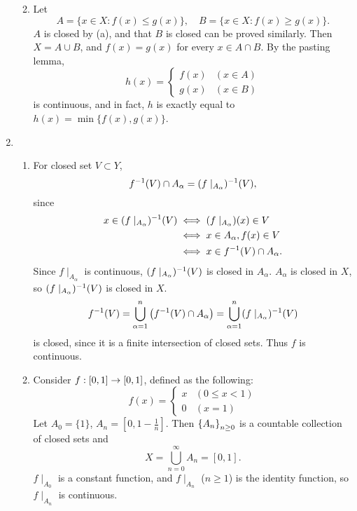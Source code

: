 \documentclass[12pt]{report}
\newcommand{\prob}[1]{\item[\large\textbf{\sffamily #1.}]}
\newcommand{\subprob}[1]{\item[\textbf{\sffamily (#1)}]}
\begin{document}
\begin{enumerate}
\begin{enumerate}
        \subprob{b} Let
        \[
            A = \{x \in X : f(x) \leq g(x)\}, \quad B = \{x \in X : f(x) \geq g(x)\}.
        \]
        \(A\) is closed by {\sf (a)}, and that \(B\) is closed can be proved similarly. Then \(X = A \cup B\), and \(f(x) = g(x)\) for every \(x \in A \cap B\). By the pasting lemma,
        \[
            h(x) = \begin{cases}
                f(x) & (x\in A) \\ g(x) & (x \in B)
            \end{cases}
        \]
        is continuous, and in fact, \(h\) is exactly equal to \(h(x) = \min\{f(x), g(x)\}\).
    \end{enumerate}

    \prob{8}
    \begin{enumerate}
        \subprob{a} For closed set \(V \subset Y\),
        \[
            f^{-1}(V) \cap A_\alpha = (f \mid_{A_\alpha})^{-1}(V),
        \]
        since
        \[
            \begin{aligned}
                x \in (f \mid_{A_\alpha})^{-1}(V) & \iff (f \mid_{A_\alpha})(x) \in V  \\
                                                 & \iff x \in A_\alpha, f(x) \in V    \\
                                                 & \iff x \in f^{-1}(V) \cap A_\alpha.
            \end{aligned}
        \]
        Since \(f \mid_{A_\alpha}\) is continuous, \((f \mid_{A_\alpha})^{-1}(V)\) is closed in \(A_\alpha\). \(A_\alpha\) is closed in \(X\), so \((f \mid_{A_\alpha})^{-1}(V)\) is closed in \(X\).
        \[
            f^{-1}(V) = \bigcup_{\alpha = 1}^n \left( f^{-1}(V) \cap A_\alpha \right) = \bigcup_{\alpha = 1}^n (f \mid_{A_\alpha})^{-1}(V)
        \]
        is closed, since it is a finite intersection of closed sets. Thus \(f\) is continuous.

        \subprob{b} Consider \(f: [0, 1] \rightarrow [0, 1]\), defined as the following:
        \[
            f(x) = \begin{cases}
                x & (0 \leq x < 1) \\ 0 & (x = 1)
            \end{cases}
        \]
        Let \(A_0 = \{1\}\), \(A_n = \left[0, 1 - \frac{1}{n}\right]\). Then \(\left\{ A_n \right\}_{n\geq 0}\) is a countable collection of closed sets and
        \[
            X = \bigcup_{n=0}^\infty A_n = [0, 1].
        \]
        \(f \mid_{A_0}\) is a constant function, and \(f \mid_{A_n}\) (\(n \geq 1\)) is the identity function, so \(f \mid_{A_n}\) is continuous.


\end{enumerate}
\end{enumerate}
\end{document}
